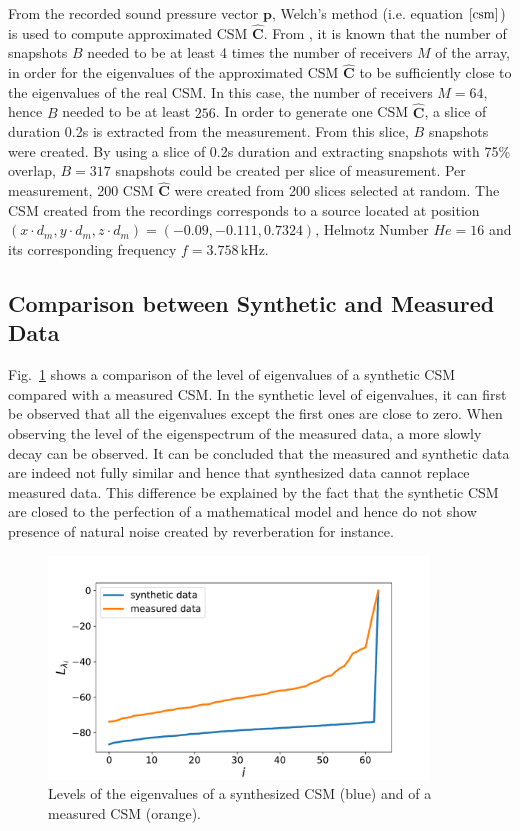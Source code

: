 \documentclass[11pt,a4paper,twoside]{report}
\begin{document}
From the recorded sound pressure vector $\mathbf{p}$, Welch's method (i.e. equation $\ref{csm}$) is used to compute approximated CSM $\hat{\mathbf{C}}$. From \cite{gerstoft2012eigenvalues}, it is known that the number of snapshots $B$ needed to be at least 4 times the number of receivers $M$ of the array, in order for the eigenvalues of the approximated CSM $\hat{\mathbf{C}}$ to be sufficiently close to the eigenvalues of the real CSM. In this case, the number of receivers $M = 64$, hence $B$ needed to be at least $256$. In order to generate one CSM $\hat{\mathbf{C}}$, a slice of duration 0.2s is extracted from the measurement. From this slice, $B$ snapshots were created. By using a slice of 0.2s duration and extracting snapshots with 75\% overlap, $B = 317$ snapshots could be created per slice of measurement. Per measurement, 200 CSM $\hat{\mathbf{C}}$ were created from 200 slices selected at random. The CSM created from the recordings corresponds to a source located at position $(x \cdot d_m,y \cdot d_m, z \cdot d_m) = (-0.09,-0.111, 0.7324)$, Helmotz Number $He = 16$ and its corresponding frequency $f = 3.758\,$kHz.


\subsection{Comparison between Synthetic and Measured Data}

Fig.~\ref{fig:comparison_synthetic_measurement_data} shows a comparison of the level of eigenvalues of a synthetic CSM compared with a measured CSM. In the synthetic level of eigenvalues, it can first be observed that all the eigenvalues except the first ones are close to zero. When observing the level of the eigenspectrum of the measured data, a more slowly decay can be observed. It can be concluded that the measured and synthetic data are indeed not fully similar and hence that synthesized data cannot replace measured data. This difference be explained by the fact that the synthetic CSM are closed to the perfection of a mathematical model and hence do not show presence of natural noise created by reverberation for instance.

\begin{figure}
    \centering
    \includegraphics[width=0.9\textwidth]{figs/comparison_synthetic_measurement_data.pdf}
    \caption{Levels of the eigenvalues of a synthesized CSM (blue) and of a measured CSM (orange).}
    \label{fig:comparison_synthetic_measurement_data}    
\end{figure}
\end{document}

